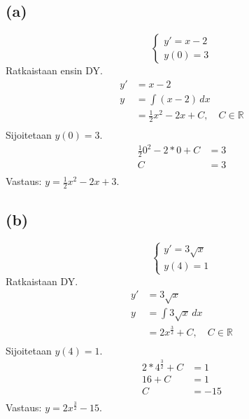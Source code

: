 \documentclass{article}
\begin{document}
\subsection*{(a)}
\[
  \begin{cases}
    y' = x - 2 \\
    y(0) = 3
  \end{cases}
\]
Ratkaistaan ensin DY.
\begin{align*}
  y' &= x - 2 \\
  y &= \int (x - 2)\,dx \\
    &= \frac{1}{2} x^2 - 2x + C, \quad C \in \mathbb{R} \\
\end{align*}
Sijoitetaan $y(0) = 3$.
\begin{align*}
  \frac{1}{2} 0^2 - 2 * 0 + C &= 3 \\
  C &= 3 \\
\end{align*}
Vastaus: $y = \frac{1}{2} x^2 - 2x + 3$.

\subsection*{(b)}
\[
\begin{cases}
  y' = 3\sqrt{x} \\
  y(4) = 1
\end{cases}
\]
Ratkaistaan DY.
\begin{align*}
  y' &= 3\sqrt{x} \\
  y &= \int 3\sqrt{x} \,dx \\
    &= 2x^{\frac{3}{2}} + C, \quad C \in \mathbb{R} \\
\end{align*}
Sijoitetaan $y(4) = 1$.
\begin{align*}
  2*4^{\frac{3}{2}} + C &= 1 \\
  16 + C &= 1 \\
  C &= -15 \\
\end{align*}
Vastaus: $y = 2x^{\frac{3}{2}} - 15$.
\end{document}

